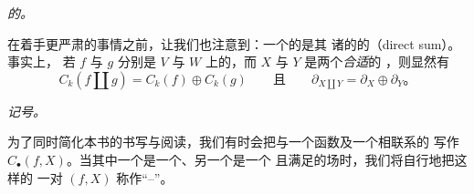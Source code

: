 \emph{\trDisjointUnion{}的\trHomology。}

在着手更严肃的事情之前，让我们也注意到：一个\trDisjointUnion{}的\trMorseHomology{}是其
诸\trConnectedComponent{}的\trHomology{}的\textbf{\trDirectSum}（direct sum）。事实上，
若 $f$ 与 $g$ 分别是 $V$ 与 $W$ 上的\trMorseFunction，而 $X$ 与 $Y$ 是两个\emph{合适}的%
\trVectorField，则显然有
\[
C_k(f\amalg g)=C_k(f)\oplus C_k(g)
\qquad\text{且}\qquad
\partial_{X\amalg Y}=\partial_X\oplus\partial_Y\text{。}
\]

\emph{记号。}

为了同时简化本书的书写与阅读，我们有时会把与一个函数及一个\trVectorField{}相联系的%
\trComplex{}写作 $C_\bullet(f,X)$。当其中一个是一个\trMorseFunction、另一个是一个%
\trAdapted{}且满足\trSmaleCondition{}的\trPseudogradient{}场时，我们将自行地把这样的
一对 $(f,X)$ 称作“\trMorse--\trSmale”。
